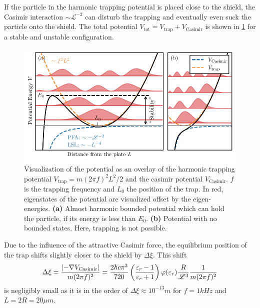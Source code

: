 If the particle in the harmonic trapping potential is placed close to the shield, the Casimir interaction $\sim \mathscr{L}^{-2}$ can disturb the trapping and eventually even suck the particle onto the shield.
The total potential $V_\mathrm{tot}=V_\mathrm{trap} + V_\mathrm{Casimir}$ is shown in \cref{fig:4:trap-eigenstates} for a stable and unstable configuration.
\begin{figure}[!htbp]
  \centering
  \includegraphics[width=\textwidth]{./../figures/others/trapping-potential-eigenstates.pdf}
  \caption{Visualization of the potential as an overlay of the harmonic trapping potential $V_\mathrm{trap} = m (2\pi f)^2 L^2 / 2$ and the casimir potential $V_\mathrm{Casimir}$. $f$ is the trapping frequency and $L_0$ the position of the trap. In red, eigenstates of the potential are visualized offset by the eigen-energies.
  \textbf{(a)} Almost harmonic bounded potential which can hold the particle, if its energy is less than $E_0$.
  \textbf{(b)} Potential with no bounded states. Here, trapping is not possible.}
  \label{fig:4:trap-eigenstates}
\end{figure}
Due to the influence of the attractive Casimir force, the equilibrium position of the trap shifts slightly closer to the shield by $\Delta \xi$. This shift
\begin{equation}
  \Delta \xi = \frac{\left\lvert-\nabla V_\mathrm{Casimir}\right\rvert}{m (2\pi f)^2} = \frac{2 \hbar c \pi^3}{720} \left(\frac{\varepsilon_r - 1}{\varepsilon_r + 1}\right) \varphi(\varepsilon_r) \frac{R}{\mathscr{L}^3} \frac{1}{m (2\pi f)^2}
\end{equation}
is negligibly small as it is in the order of $\Delta \xi \approx 10^{-13}\si{m}$ for $f=1\si{kHz}$ and $L = 2R = 20\si{\mu m}$.

